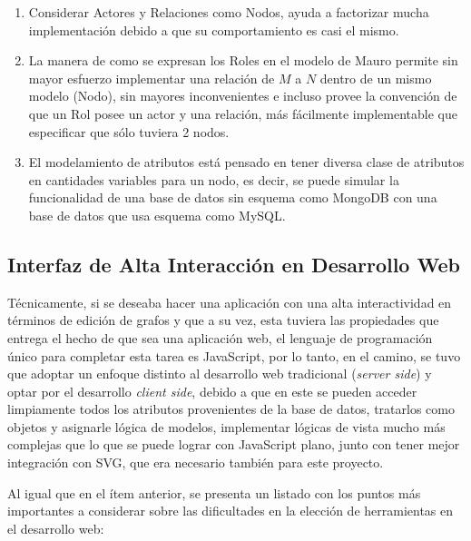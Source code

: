   \begin{enumerate}
    \item Considerar Actores y Relaciones como Nodos, ayuda a factorizar mucha implementación debido a que su comportamiento es casi el mismo.
    
    \item La manera de como se expresan los Roles en el modelo de Mauro permite sin mayor esfuerzo implementar una relación de $M$ a $N$ dentro de un mismo modelo (Nodo), sin mayores inconvenientes e incluso provee la convención de que un Rol posee un actor y una relación, más fácilmente implementable que especificar que sólo tuviera 2 nodos.
    
    \item El modelamiento de atributos está pensado en tener diversa clase de atributos en cantidades variables para un nodo, es decir, se puede simular la funcionalidad de una base de datos sin esquema como MongoDB con una base de datos que usa esquema como MySQL.
  \end{enumerate}



\subsection{Interfaz de Alta Interacción en Desarrollo Web} %
\label{sub:interfaz_de_alta_interaccion_en_desarrollo_web}

Técnicamente, si se deseaba hacer una aplicación con una alta interactividad en términos de edición de grafos y que a su vez, esta tuviera las propiedades que entrega el hecho de que sea una aplicación web, el lenguaje de programación único para completar esta tarea es JavaScript, por lo tanto, en el camino, se tuvo que adoptar un enfoque distinto al desarrollo web tradicional (\emph{server side}) y optar por el desarrollo \emph{client side}, debido a que en este se pueden acceder limpiamente todos los atributos provenientes de la base de datos, tratarlos como objetos y asignarle lógica de modelos, implementar lógicas de vista mucho más complejas que lo que se puede lograr con JavaScript plano, junto con tener mejor integración con SVG, que era necesario también para este proyecto.

Al igual que en el ítem anterior, se presenta un listado con los puntos más importantes a considerar sobre las dificultades en la elección de herramientas en el desarrollo web:

